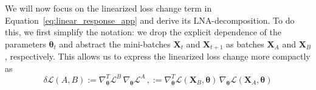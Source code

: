 We will now focus on the linearized loss change term in Equation~\ref{eq:linear_response_app} and derive its LNA-decomposition. To do this, we first simplify the notation:
we drop the explicit dependence of the parameters \(\boldsymbol{\theta}_t\) and abstract the mini-batches \(\mathbf{X}_t\) and \(\mathbf{X}_{t+1}\) as batches \(\mathbf{X}_A\) and \(\mathbf{X}_B\), respectively.
This allows us to express the linearized loss change more compactly as
\begin{equation}
    \delta \mathcal{L}(A, B) 
    := \nabla^T_{\boldsymbol{\theta}} \mathcal{L}^B \, \nabla_{\boldsymbol{\theta}} \mathcal{L}^A \, ,
    := \nabla^T_{\boldsymbol{\theta}} \mathcal{L}(\mathbf{X}_B, \boldsymbol{\theta}) \, \nabla_{\boldsymbol{\theta}} \mathcal{L}(\mathbf{X}_A, \boldsymbol{\theta}) 
    \label{eq:linearized_loss_app}
\end{equation}

